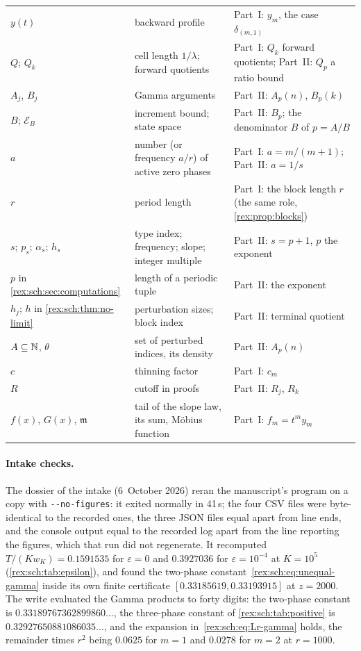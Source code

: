 {\begin{longtable}{@{}>{\raggedright\arraybackslash}p{}>{\raggedright\arraybackslash}p{}>{\raggedright\arraybackslash}p{}@{}}
$y(t)$ & backward profile & Part~I: $y_m$, the case $\delta_{(m,1)}$\\
$Q$; $Q_k$ & cell length $1/\lambda$; forward quotients & Part~I: $Q_k$ forward quotients; Part~II: $Q_p$ a ratio bound\\
$A_j$, $B_j$ & Gamma arguments & Part~II: $A_p(n)$, $B_p(k)$\\
$B$; $\mathcal E_B$ & increment bound; state space & Part~II: $B_p$; the denominator $B$ of $p=A/B$\\
$a$ & number (or frequency $a/r$) of active zero phases & Part~I: $a=m/(m+1)$; Part~II: $a=1/s$\\
$r$ & period length & Part~I: the block length $r$ (the same role, \cref{rex:prop:blocks})\\
$s$; $p_s$; $\alpha_s$; $h_s$ & type index; frequency; slope; integer multiple & Part~II: $s=p+1$, $p$ the exponent\\
$p$ in \cref{rex:sch:sec:computations} & length of a periodic tuple & Part~II: the exponent\\
$h_j$; $h$ in \cref{rex:sch:thm:no-limit} & perturbation sizes; block index & Part~II: terminal quotient\\
$A\subseteq\mathbb N$, $\theta$ & set of perturbed indices, its density & Part~II: $A_p(n)$\\
$c$ & thinning factor & Part~I: $c_m$\\
$R$ & cutoff in proofs & Part~II: $R_j$, $R_k$\\
$f(x)$, $G(x)$, $\mathfrak m$ & tail of the slope law, its sum, M\"obius function & Part~I: $f_m=t^my_m$\\
\end{longtable}
}

\paragraph{Intake checks.} The dossier of the intake (6~October 2026)
reran the manuscript's program on a copy with
\texttt{-{}-no-figures}: it exited normally in 41\,s; the four CSV files
were byte-identical to the recorded ones, the three JSON files equal apart
from line ends, and the console output equal to the recorded log apart
from the line reporting the figures, which that run did not regenerate. It
recomputed $T/(Kw_K)=0.1591535$ for $\varepsilon=0$ and $0.3927036$ for
$\varepsilon=10^{-4}$ at $K=10^5$ (\cref{rex:sch:tab:epsilon}), and found
the two-phase constant~\eqref{rex:sch:eq:unequal-gamma} inside its own
finite certificate $[0.33185619,0.33193915]$ at $z=2000$. The write
evaluated the Gamma products to forty digits: the two-phase constant is
$0.33189767362899860\ldots$, the three-phase constant of
\cref{rex:sch:tab:positive} is $0.32927650881086035\ldots$, and the
expansion in~\eqref{rex:sch:eq:Lr-gamma} holds, the remainder times $r^2$
being $0.0625$ for $m=1$ and $0.0278$ for $m=2$ at $r=1000$.

